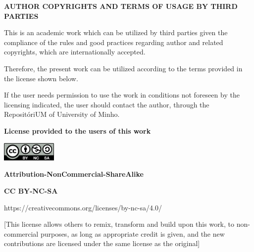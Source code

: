 \begin{center}
    \textbf{AUTHOR COPYRIGHTS AND TERMS OF USAGE BY THIRD PARTIES}
\end{center}

    This is an academic work which can be utilized by third parties given the compliance of the rules and good practices regarding author and related copyrights, which are internationally accepted.
        
    Therefore, the present work can be utilized according to the terms provided in the license shown below.
        
    If the user needs permission to use the work in conditions not foreseen by the licensing indicated, the user should contact the author, through the RepositóriUM of University of Minho.
        
    \bigskip
    
    \textbf{License provided to the users of this work}
    
    \bigskip
    
    \includegraphics[width=0.2\textwidth]{img/copyright.png}
    
    \textbf{Attribution-NonCommercial-ShareAlike}
    
    \textbf{CC BY-NC-SA}
    
    https://creativecommons.org/licenses/by-nc-sa/4.0/
    
    [This license allows others to remix, transform and build upon this work, to non-commercial purposes, as long as appropriate credit is given, and the new contributions are licensed under the same license as the original]
      
